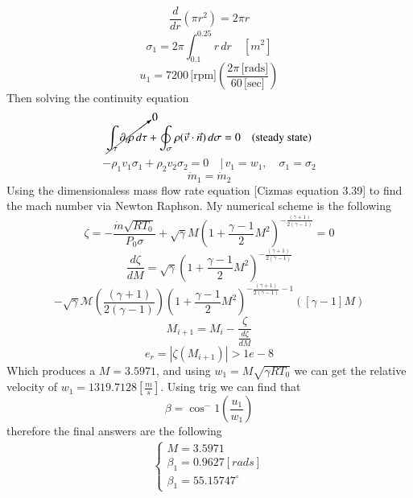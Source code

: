 \documentclass[12pt]{exam}
\begin{document}
\begin{questions}
\begin{solutionorbox}[\stretch{1}]
\[\frac{d}{dr} \left( \pi r^2 \right) = 2 \pi r\]
\[\sigma_1 = 2 \pi \int_{0.1}^{0.25} r \, dr \quad \left[ m^2 \right]\]
\[u_1 = 7200 \, \text{[rpm]} \left( \frac{2 \pi \, \text{[rads]}}{60 \, \text{[sec]}} \right)\]
Then solving the continuity equation
\[\cancelto{0}{\int_{\tau} \partial_t \rho \, d\tau} + \oint_{\sigma} \rho (\vec{v} \cdot \vec{n}) \, d\sigma = 0
\quad \text{(steady state)}\]
\[-\rho_1 v_1 \sigma_1 + \rho_2 v_2 \sigma_2 = 0 \quad \Bigg| \, v_1 = w_1, \quad \sigma_1 = \sigma_2\]
\[\dot{m}_1 = \dot{m}_2\]
Using the dimensionaless mass flow rate equation [Cizmas equation 3.39] to find the mach number via Newton Raphson.
My numerical scheme is the following
\[\zeta = -\frac{\dot{m}\sqrt{R T_0}}{P_0 \sigma} + \sqrt{\gamma} M \left( 1 + \frac{\gamma-1}{2} M^2 \right)^{-\frac{(\gamma+1)}{2(\gamma-1)}} = 0
\]
\[
\frac{d\zeta}{dM} = \sqrt{\gamma} \left( 1 + \frac{\gamma-1}{2} M^2 \right)^{-\frac{(\gamma+1)}{2(\gamma-1)}} 
\]\[ -\sqrt{\gamma} \mathcal{M} \left( \frac{(\gamma+1)}{2(\gamma-1)} \right) \left( 1 + \frac{\gamma-1}{2} M^2 \right)^{-\frac{(\gamma+1)}{2(\gamma-1)} - 1} 
\left( [\gamma - 1] M \right)
\]
\[M_{i+1} = M_i - \frac{\zeta}{\frac{d\zeta}{dM}}
\]
\[e_r = \left| \zeta(M_{i+1}) \right| > 1e-8
\]
Which produces a \(M = 3.5971\), and using \(w_1 = M\sqrt{\gamma R T_0}\) we can get the relative velocity of \(w_1 = 1319.7128 \left[\frac{m}{s}\right]\). Using trig we can find that 
\[\beta = \cos^-1\left(\frac{u_1}{w_1}\right)\]
therefore the final answers are the following
\begin{align*}
\begin{cases}
  M = 3.5971\\
  \beta_1 = 0.9627 \left[rads\right]\\
  \beta_1 = 55.15747^\circ
\end{cases}
\end{align*}

\end{solutionorbox}

\end{questions}

\end{document}
